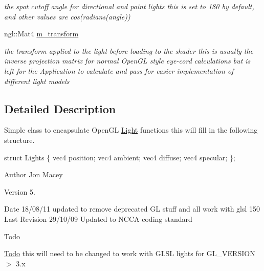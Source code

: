 \begin{DoxyCompactItemize}
\begin{DoxyCompactList}\small\item\em the spot cutoff angle for directional and point lights this is set to 180 by default, and other values are cos(radians(angle)) \end{DoxyCompactList}\item 
\hypertarget{classngl_1_1_light_ab905d7f0ee91e2a482ce5d4d99bb81fd}{ngl\-::\-Mat4 \hyperlink{classngl_1_1_light_ab905d7f0ee91e2a482ce5d4d99bb81fd}{m\-\_\-transform}}\label{classngl_1_1_light_ab905d7f0ee91e2a482ce5d4d99bb81fd}

\begin{DoxyCompactList}\small\item\em the transform applied to the light before loading to the shader this is usually the inverse projection matrix for normal Open\-G\-L style eye-\/cord calculations but is left for the Application to calculate and pass for easier implementation of different light models \end{DoxyCompactList}\end{DoxyCompactItemize}


\subsection{Detailed Description}
Simple class to encapsulate Open\-G\-L \hyperlink{classngl_1_1_light}{Light} functions this will fill in the following structure. 

struct Lights \{ vec4 position; vec4 ambient; vec4 diffuse; vec4 specular; \}; \begin{DoxyAuthor}{Author}
Jon Macey 
\end{DoxyAuthor}
\begin{DoxyVersion}{Version}
5. 
\end{DoxyVersion}
\begin{DoxyDate}{Date}
18/08/11 updated to remove deprecated G\-L stuff and all work with glsl 150 Last Revision 29/10/09 Updated to N\-C\-C\-A coding standard 
\end{DoxyDate}
\begin{DoxyRefDesc}{Todo}
\item[\hyperlink{todo__todo000003}{Todo}]this will need to be changed to work with G\-L\-S\-L lights for G\-L\-\_\-\-V\-E\-R\-S\-I\-O\-N $>$ 3.\-x \end{DoxyRefDesc}


